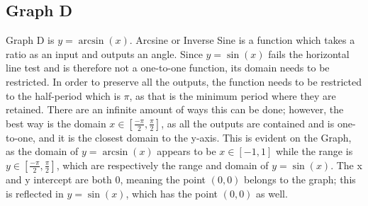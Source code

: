 \subsection{Graph D}

Graph D is ${y=\arcsin(x)}$.
Arcsine or Inverse Sine is a function which takes a ratio as an input and outputs an angle.
Since ${y=\sin(x)}$ fails the horizontal line test and is therefore not a one-to-one function, its domain needs to be restricted.
In order to preserve all the outputs, the function needs to be restricted to the half-period which is ${\pi}$, as that is the minimum period where they are retained.
There are an infinite amount of ways this can be done; however, the best way is the domain ${x \in {[\frac{-\pi}{2}, \frac{\pi}{2}]}}$, as all the outputs are contained and is one-to-one, and it is the closest domain to the y-axis.
This is evident on the Graph, as the domain of ${y=\arcsin(x)}$ appears to be ${x \in {[{-1}, {1}]}}$ while the range is ${y \in {[\frac{-\pi}{2}, \frac{\pi}{2}]}}$, which are respectively the range and domain of ${y=\sin(x)}$.
The x and y intercept are both 0, meaning the point ${(0, 0)}$ belongs to the graph; this is reflected in ${y=\sin(x)}$, which has the point ${(0, 0)}$ as well.
